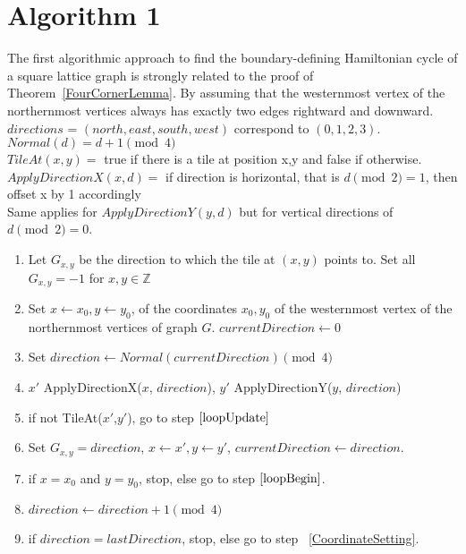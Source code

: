 \section{Algorithm 1}
The first algorithmic approach to find the boundary-defining Hamiltonian cycle of a square lattice graph is strongly related to the proof of Theorem~\ref{FourCornerLemma}. By assuming that the westernmost vertex of the northernmost vertices always has exactly two edges rightward and downward.
\\$directions$ = $(north,east,south,west)$ correspond to $(0,1,2,3)$.
\\$Normal(d) = d+1 \pmod{4}$
\\$TileAt(x,y) =$ true if there is a tile at position x,y and false if otherwise.
\\$ApplyDirectionX(x, d) =$ if direction is horizontal, that is $d \pmod{2} = 1$, then offset x by 1 accordingly
\\Same applies for $ApplyDirectionY(y,d)$ but for vertical directions of $d \pmod{2} = 0$.
\begin{enumerate}[\bf 1.]
\item Let $G_{x,y}$ be the direction to which the tile at $(x,y)$ points to. Set all $G_{x,y}=-1$ for $x,y \in \mathbb{Z}$
\item Set $x\gets x_0, y\gets y_0$, of the coordinates $x_0,y_0$ of the westernmost vertex of the northernmost vertices of graph $G$. $currentDirection\gets 0$
\item \label{loopBegin} Set $direction \gets Normal(currentDirection) \pmod{4}$
\item \label{CoordinateSetting} $x'$ \gets ApplyDirectionX($x$, $direction$), $y'$ \gets ApplyDirectionY($y$, $direction$)
\item if not TileAt($x'$,$y'$), go to step $\ref{loopUpdate}$
\item Set $G_{x,y} = direction$, $x \gets x', y \gets y'$, $currentDirection \gets direction$.
\item if $x=x_0$ and $y=y_0$, stop, else go to step $\ref{loopBegin}$.
\item \label{loopUpdate} $direction \gets direction+1 \pmod{4}$
\item if $direction = lastDirection$, stop, else go to step ~\ref{CoordinateSetting}.
\end{enumerate}
